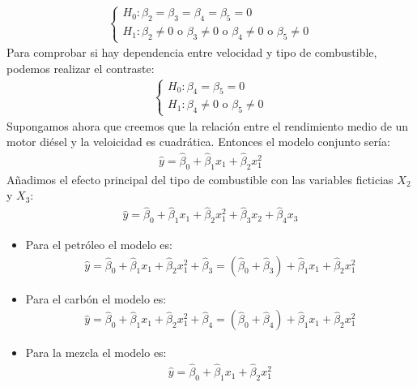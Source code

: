 \begin{ejemplo}
\begin{align*}
    \begin{cases}
        H_0: \beta_2 = \beta_3 = \beta_4 = \beta_5 = 0 \\
        H_1: \beta_2 \neq 0 \text{ o } \beta_3 \neq 0 \text{ o } \beta_4 \neq 0 \text{ o } \beta_5 \neq 0
    \end{cases}
\end{align*}
Para comprobar si hay dependencia entre velocidad y tipo de combustible, podemos realizar el contraste:
\begin{align*}
    \begin{cases}
            H_0: \beta_4 = \beta_5 = 0 \\
            H_1: \beta_4 \neq 0 \text{ o } \beta_5 \neq 0
        \end{cases}
\end{align*}
Supongamos ahora que creemos que la relación entre el rendimiento medio de un motor diésel y la veloicidad es cuadrática. Entonces el modelo conjunto sería:
\begin{align*}
    \widehat{y} = \widehat{\beta}_0 + \widehat{\beta}_1x_1 + \widehat{\beta}_2x_1^2
\end{align*}
Añadimos el efecto principal del tipo de combustible con las variables ficticias $X_2$ y $X_3$:
\begin{align*}
    \widehat{y} = \widehat{\beta}_0 + \widehat{\beta}_1x_1 + \widehat{\beta}_2x_1^2 + \widehat{\beta}_3x_2 + \widehat{\beta}_4x_3
\end{align*}
\begin{itemize}
    \item Para el petróleo el modelo es:
        \begin{align*}
            \widehat{y} = \widehat{\beta}_0 + \widehat{\beta}_1x_1 + \widehat{\beta}_2x_1^2 + \widehat{\beta}_3 = (\widehat{\beta}_0 + \widehat{\beta}_3) + \widehat{\beta}_1x_1 + \widehat{\beta}_2x_1^2
        \end{align*}
    \item Para el carbón el modelo es:
        \begin{align*}
            \widehat{y} = \widehat{\beta}_0 + \widehat{\beta}_1x_1 + \widehat{\beta}_2x_1^2 + \widehat{\beta}_4 = (\widehat{\beta}_0 + \widehat{\beta}_4) + \widehat{\beta}_1x_1 + \widehat{\beta}_2x_1^2
        \end{align*}
    \item Para la mezcla el modelo es:
        \begin{align*}
            \widehat{y} = \widehat{\beta}_0 + \widehat{\beta}_1x_1 + \widehat{\beta}_2x_1^2

\end{align*}
\end{itemize}
\end{ejemplo}
